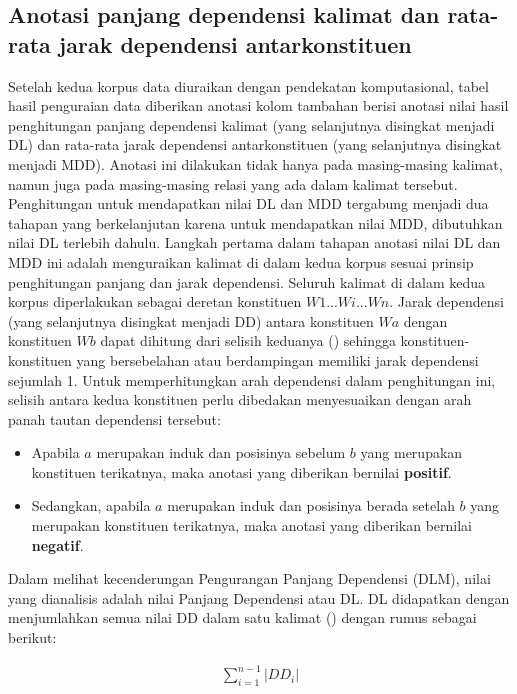 \subsection{Anotasi panjang dependensi kalimat dan rata-rata jarak dependensi antarkonstituen}
Setelah kedua korpus data diuraikan dengan pendekatan komputasional, tabel hasil penguraian data diberikan anotasi kolom tambahan berisi anotasi nilai hasil penghitungan panjang dependensi kalimat (yang selanjutnya disingkat menjadi DL) dan rata-rata jarak dependensi antarkonstituen (yang selanjutnya disingkat menjadi MDD). Anotasi ini dilakukan tidak hanya pada masing-masing kalimat, namun juga pada masing-masing relasi yang ada dalam kalimat tersebut. Penghitungan untuk mendapatkan nilai DL dan MDD tergabung menjadi dua tahapan yang berkelanjutan karena untuk mendapatkan nilai MDD, dibutuhkan nilai DL terlebih dahulu. Langkah pertama dalam tahapan anotasi nilai DL dan MDD ini adalah menguraikan kalimat di dalam kedua korpus sesuai prinsip penghitungan panjang dan jarak dependensi. Seluruh kalimat di dalam kedua korpus diperlakukan sebagai deretan konstituen $W1...Wi...Wn$. Jarak dependensi (yang selanjutnya disingkat menjadi DD) antara konstituen $Wa$ dengan konstituen $Wb$ dapat dihitung dari selisih keduanya (\citealp{liu2008dependency, liu2017dependency, futrell2015large}) sehingga konstituen-konstituen yang bersebelahan atau berdampingan memiliki jarak dependensi sejumlah 1. Untuk memperhitungkan arah dependensi dalam penghitungan ini, selisih antara kedua konstituen perlu dibedakan menyesuaikan dengan arah panah tautan dependensi tersebut:
\begin{itemize}
\item Apabila $a$ merupakan induk dan posisinya sebelum $b$ yang merupakan konstituen terikatnya, maka anotasi yang diberikan bernilai \textbf{positif}.
\item Sedangkan, apabila $a$ merupakan induk dan posisinya berada setelah $b$ yang merupakan konstituen terikatnya, maka anotasi yang diberikan bernilai \textbf{negatif}. 
\end{itemize}
Dalam melihat kecenderungan Pengurangan Panjang Dependensi (DLM), nilai yang dianalisis adalah nilai Panjang Dependensi atau DL. DL didapatkan dengan menjumlahkan semua nilai DD dalam satu kalimat (\citealp{gildea2010grammars, futrell2015large}) dengan rumus sebagai berikut: 

\noindent \begin{align}\label{eq:bola}
	\displaystyle\sum_{i=1}^{n-1} |DD_i|
\end{align}

